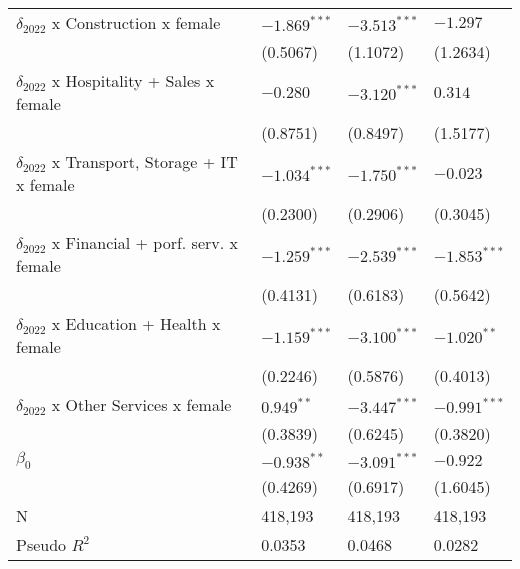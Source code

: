 \begin{tabular}{llll}
$\delta_{2022}$ x Construction x female            &     $-1.869^{***}$ &     $-3.513^{***}$ &           $-1.297$ \\
                                                   &           (0.5067) &           (1.1072) &           (1.2634) \\
$\delta_{2022}$ x Hospitality + Sales x female     &           $-0.280$ &     $-3.120^{***}$ &            $0.314$ \\
                                                   &           (0.8751) &           (0.8497) &           (1.5177) \\
$\delta_{2022}$ x Transport, Storage + IT x female &     $-1.034^{***}$ &     $-1.750^{***}$ &           $-0.023$ \\
                                                   &           (0.2300) &           (0.2906) &           (0.3045) \\
$\delta_{2022}$ x Financial + porf. serv. x female &     $-1.259^{***}$ &     $-2.539^{***}$ &     $-1.853^{***}$ \\
                                                   &           (0.4131) &           (0.6183) &           (0.5642) \\
$\delta_{2022}$ x Education + Health x female      &     $-1.159^{***}$ &     $-3.100^{***}$ &      $-1.020^{**}$ \\
                                                   &           (0.2246) &           (0.5876) &           (0.4013) \\
$\delta_{2022}$ x Other Services x female          &       $0.949^{**}$ &     $-3.447^{***}$ &     $-0.991^{***}$ \\
                                                   &           (0.3839) &           (0.6245) &           (0.3820) \\
$\beta_0$                                          &      $-0.938^{**}$ &     $-3.091^{***}$ &           $-0.922$ \\
                                                   &           (0.4269) &           (0.6917) &           (1.6045) \\
N                                                  &            418,193 &            418,193 &            418,193 \\
Pseudo $R^2$                                       &             0.0353 &             0.0468 &             0.0282 \\
\bottomrule
\end{tabular}
